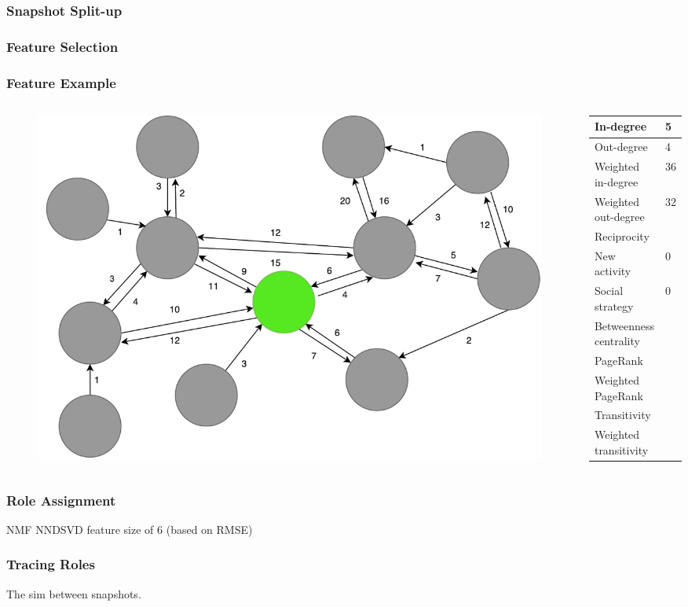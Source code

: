 \begin{frame}
\frametitle{Snapshot Split-up}
\end{frame}

\begin{frame}
\frametitle{Feature Selection}
\end{frame}

\begin{frame}
\frametitle{Feature Example}


\begin{columns}
		\begin{column}{0.5\textwidth}
			\begin{figure}
				\includegraphics[scale=0.27]{graphics/directed_network_example.pdf}
			\end{figure}
		\end{column}
		\begin{column}{0.5\textwidth}
			\begin{table}
				\begin{tabular}{|l|l|}
				\hline
					In-degree				& 5		\\ \hline
					Out-degree				& 4		\\ \hline
					Weighted in-degree		& 36	\\ \hline
					Weighted out-degree		& 32	\\ \hline
					Reciprocity				& 		\\ \hline
					New activity			& 0		\\ \hline
					Social strategy			& 0		\\ \hline
					Betweenness centrality	& 		\\ \hline
					PageRank				& 		\\ \hline
					Weighted PageRank		& 		\\ \hline
					Transitivity			& 		\\ \hline
					Weighted transitivity 	& 		\\ \hline
			\end{tabular}
			\end{table}
		\end{column}
	\end{columns}

\end{frame}

\begin{frame}
\frametitle{Role Assignment}
NMF
NNDSVD
feature size of 6 (based on RMSE)
\end{frame}

\begin{frame}
\frametitle{Tracing Roles}
The sim between snapshots. 
\end{frame}